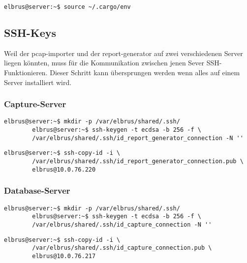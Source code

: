 \documentclass{article}
\begin{document}
	\begin{lstlisting}[caption={Hinzufügen des Befehls Cargo zu dem Pfad.}]
		elbrus@server:~$ source ~/.cargo/env
	\end{lstlisting}

	\newpage
	\subsection{SSH-Keys}
	
	Weil der pcap-importer und der report-generator auf zwei verschiedenen Server liegen könnten, muss für die Kommunikation zwischen jenen Sever SSH-Funktionieren.
	\newline\newline
	Dieser Schritt kann übersprungen werden wenn alles auf einem Server installiert wird.
	
	\subsubsection{Capture-Server}
	\begin{lstlisting}[caption={Anlegen der SSH-Keys.}]
		elbrus@server:~$ mkdir -p /var/elbrus/shared/.ssh/
		elbrus@server:~$ ssh-keygen -t ecdsa -b 256 -f \
		/var/elbrus/shared/.ssh/id_report_generator_connection -N ''
	\end{lstlisting}
	
	\begin{lstlisting}[caption={Übertragen der SSH-Keys auf den Database-Server.}]
		elbrus@server:~$ ssh-copy-id -i \
		/var/elbrus/shared/.ssh/id_report_generator_connection.pub \
		elbrus@10.0.76.220
	\end{lstlisting}
	
	\subsubsection{Database-Server}
	\begin{lstlisting}[caption={Anlegen der SSH-Keys.}]
		elbrus@server:~$ mkdir -p /var/elbrus/shared/.ssh/
		elbrus@server:~$ ssh-keygen -t ecdsa -b 256 -f \
		/var/elbrus/shared/.ssh/id_capture_connection -N ''
	\end{lstlisting}
	
	\begin{lstlisting}[caption={Übertragen der SSH-Keys auf den Capture-Server.}]
		elbrus@server:~$ ssh-copy-id -i \
		/var/elbrus/shared/.ssh/id_capture_connection.pub \
		elbrus@10.0.76.217
	\end{lstlisting}
	
\end{document}
